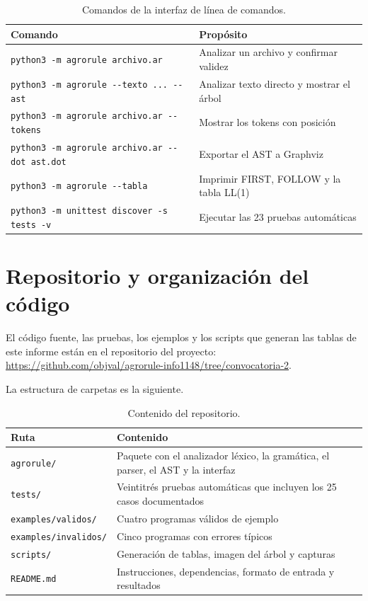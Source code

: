 \documentclass[11pt,letterpaper]{article}
\newcommand{\code}[1]{\texttt{#1}}
\newcommand{\dq}{\textquotedbl{}}
\begin{document}
\begin{table}[htbp]
\centering
\caption{Comandos de la interfaz de línea de comandos.}
\small
\begin{tabular}{L{9.4cm}L{5.6cm}}
\toprule
\textbf{Comando} & \textbf{Propósito} \\
\midrule
\code{python3 -m agrorule archivo.ar} & Analizar un archivo y confirmar validez \\
\code{python3 -m agrorule {-}{-}texto \dq ...\dq{} {-}{-}ast} & Analizar texto directo y mostrar el árbol \\
\code{python3 -m agrorule archivo.ar {-}{-}tokens} & Mostrar los tokens con posición \\
\code{python3 -m agrorule archivo.ar {-}{-}dot ast.dot} & Exportar el AST a Graphviz \\
\code{python3 -m agrorule {-}{-}tabla} & Imprimir FIRST, FOLLOW y la tabla LL(1) \\
\code{python3 -m unittest discover -s tests -v} & Ejecutar las 23 pruebas automáticas \\
\bottomrule
\end{tabular}
\end{table}

\section{Repositorio y organización del código}

El código fuente, las pruebas, los ejemplos y los scripts que generan las tablas de este informe están en el repositorio del proyecto: \url{https://github.com/objval/agrorule-info1148/tree/convocatoria-2}.

La estructura de carpetas es la siguiente.

\begin{table}[htbp]
\centering
\caption{Contenido del repositorio.}
\small
\begin{tabular}{L{4.4cm}L{10.6cm}}
\toprule
\textbf{Ruta} & \textbf{Contenido} \\
\midrule
\code{agrorule/} & Paquete con el analizador léxico, la gramática, el parser, el AST y la interfaz \\
\code{tests/} & Veintitrés pruebas automáticas que incluyen los 25 casos documentados \\
\code{examples/validos/} & Cuatro programas válidos de ejemplo \\
\code{examples/invalidos/} & Cinco programas con errores típicos \\
\code{scripts/} & Generación de tablas, imagen del árbol y capturas \\
\code{README.md} & Instrucciones, dependencias, formato de entrada y resultados \\
\bottomrule
\end{tabular}
\end{table}
\end{document}
